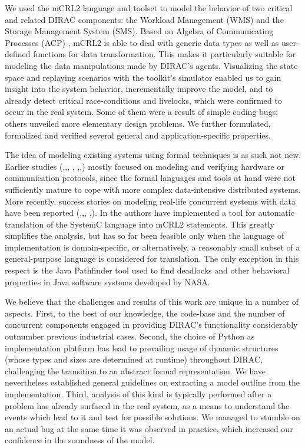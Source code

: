 \documentclass[10pt,conference]{IEEEtran}
\begin{document}
We used the mCRL2 language \cite{FormalLanguagemCRL2} and toolset \cite{mCRL2Toolset} to model the behavior of two
critical and related DIRAC components: the Workload Management (WMS) and the
Storage Management System (SMS). Based on Algebra of Communicating Processes
(ACP) \cite{process_algebra}, mCRL2 is able to deal with generic data types as well as user-defined
functions for data transformation. This makes it particularly suitable for
modeling the data manipulations made by DIRAC's agents. Visualizing the state
space and replaying scenarios with the toolkit's simulator enabled us to gain
insight into the system behavior, incrementally improve the model, and to
already detect critical race-conditions and livelocks, which were confirmed to
occur in the real system. Some of them were a result of simple coding bugs;
others unveiled more elementary design problems. We further formulated,
formalized and verified several general and application-specific properties.

The idea of modeling existing systems using 
formal techniques is as such not new. Earlier studies
(\cite{SPIN_case_study},\cite{sessionMgmtMasterThesis},\cite{
desing_validation_protocols}, \cite{protocol_verification_muCRL},
\cite{SLAMToolkit},\cite{SlidingWindowProtocol},\cite{DHCP_SPIN}) mostly focused
on modeling and verifying hardware or communication protocols, since
the formal languages and tools at hand were not sufficiently mature
to cope with more complex data-intensive distributed systems. More
recently, success stories on modeling real-life concurrent systems with
data have been reported (\cite{CMS_LHC},\cite{Linux_driver},\cite{SystemC_processAlgebra},
\cite{Java_PathFinder},\cite{ACS_mCRL2}).
In \cite{SystemC_processAlgebra} the authors have implemented a tool for automatic
translation of the SystemC language into mCRL2 statements. This greatly
simplifies the analysis, but has so far been feasible only when the
language of implementation is domain-specific, or alternatively, a
reasonably small subset of a general-purpose language is considered for
translation. The only exception in this respect is the Java Pathfinder
tool \cite{Java_PathFinder} used to find deadlocks and other behavioral properties
in Java software systems developed by NASA.

We believe that the challenges and results of this work are unique in
a number of aspects. First, to the best of our knowledge, the code-base
and the number of concurrent components engaged in providing DIRAC’s
functionality considerably outnumber previous industrial cases. Second,
the choice of Python as implementation platform has lead to prevailing
usage of dynamic structures (whose types and sizes are determined at
runtime) throughout DIRAC, challenging the transition to an abstract
formal representation. We have nevertheless established general
guidelines on extracting a model outline from the implementation. Third,
analysis of this kind is typically performed after a problem has already
surfaced in the real system, as a means to understand the events which
lead to it and test for possible solutions. We managed to stumble on an
actual bug at the same time it was observed in practice, which increased
our confidence in the soundness of the model.
\end{document}
